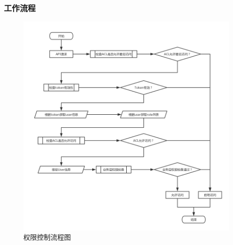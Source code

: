\documentclass[titlepage,UTF8,linespread=1.5]{ctexart}
\begin{document}
\subsubsection{工作流程}
\begin{figure}[H]
    \centering
    \includegraphics[width=150mm]{flow-auth.png}
    \caption{权限控制流程图}
    \label{fig:flow-auth}
\end{figure}
\end{document}
